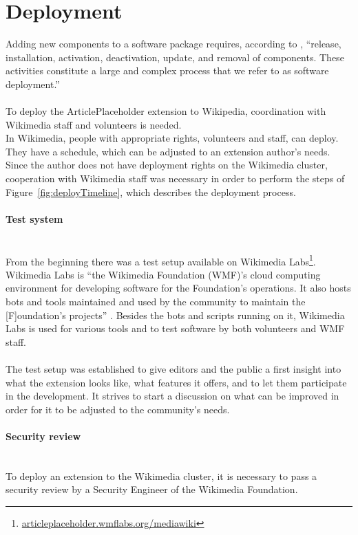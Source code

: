 \section{Deployment}

Adding new components to a software package requires, according to \citet{deployment}, ``release, installation, activation, deactivation, update, and removal of components. These activities constitute a large and complex process that we refer to as software deployment.'' \\
\\
To deploy the ArticlePlaceholder extension to Wikipedia, coordination with Wikimedia staff and volunteers is needed. \\
In Wikimedia, people with appropriate rights, volunteers and staff, can deploy. They have a schedule, which can be adjusted to an extension author's needs. Since the author does not have deployment rights on the Wikimedia cluster, cooperation with Wikimedia staff was necessary in order to perform the steps of Figure~\ref{fig:deployTimeline}, which describes the deployment process. \\



\paragraph{Test system} ~\\
From the beginning there was a test setup available on Wikimedia Labs\footnote{\url{articleplaceholder.wmflabs.org/mediawiki}}. Wikimedia Labs is ``the Wikimedia Foundation (WMF)'s cloud computing environment for developing software for the Foundation's operations. It also hosts bots and tools maintained and used by the community to maintain the [F]oundation's projects'' \citep{wiki:03}.
Besides the bots and scripts running on it, Wikimedia Labs is used for various tools and to test software by both volunteers and WMF staff. \\
\\
The test setup was established to give editors and the public a first insight into what the extension looks like, what features it offers, and to let them participate in the development. It strives to start a discussion on what can be improved in order for it to be adjusted to the community's needs.

\paragraph{Security review} ~\\
To deploy an extension to the Wikimedia cluster, it is necessary to pass a security review by a Security Engineer of the Wikimedia Foundation. 
  
